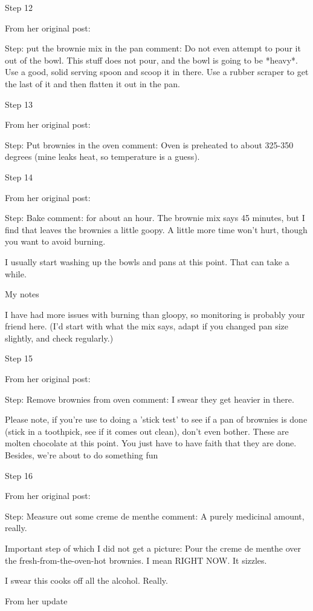Step 12

From her original post:

Step: put the brownie mix in the pan
comment: Do not even attempt to pour it out of the bowl. This stuff does not pour, and the bowl is going to be *heavy*. Use a good, solid serving spoon and scoop it in there. Use a rubber scraper to get the last of it and then flatten it out in the pan.

Step 13

From her original post:

Step: Put brownies in the oven
comment: Oven is preheated to about 325-350 degrees (mine leaks heat, so temperature is a guess).

Step 14

From her original post:

Step: Bake
comment: for about an hour. The brownie mix says 45 minutes, but I find that leaves the brownies a little goopy. A little more time won't hurt, though you want to avoid burning.

I usually start washing up the bowls and pans at this point. That can take a while.

My notes

I have had more issues with burning than gloopy, so monitoring is probably your friend here. (I'd start with what the mix says, adapt if you changed pan size slightly, and check regularly.)

Step 15

From her original post:

Step: Remove brownies from oven
comment: I swear they get heavier in there.

Please note, if you're use to doing a 'stick test' to see if a pan of brownies is done (stick in a toothpick, see if it comes out clean), don't even bother. These are molten chocolate at this point. You just have to have faith that they are done. Besides, we're about to do something fun

Step 16

From her original post:

Step: Measure out some creme de menthe
comment: A purely medicinal amount, really.

Important step of which I did not get a picture: Pour the creme de menthe over the fresh-from-the-oven-hot brownies. I mean RIGHT NOW. It sizzles.

I swear this cooks off all the alcohol. Really.

From her update

